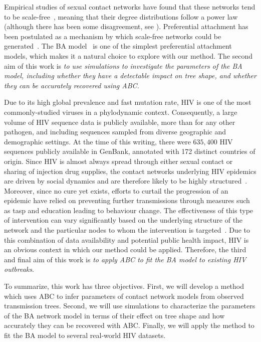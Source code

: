 Empirical studies of sexual contact networks have found that these networks
tend to be scale-free~\autocite{colgate1989risk, liljeros2001web,
schneeberger2004scale,clemenccon2015statistical}, meaning that their degree
distributions follow a power law (although there has been some disagreement,
see \autocite{handcock2004likelihood, bansal2007individual}). Preferential
attachment has been postulated as a mechanism by which scale-free networks
could be generated~\autocite{barabasi1999emergence}. The \gls{BA}
model~\autocite{barabasi1999emergence} is one of the simplest preferential
attachment models, which makes it a natural choice to explore with our method.
The second aim of this work is \emph{to use simulations to investigate the
parameters of the \gls{BA} model, including whether they have a detectable
impact on tree shape, and whether they can be accurately recovered using
\gls{ABC}.}

Due to its high global prevalence and fast mutation rate, \gls{HIV} is one of
the most commonly-studied viruses in a phylodynamic context. Consequently, a
large volume of \gls{HIV} sequence data is publicly available, more than for
any other pathogen, and including sequences sampled from diverse geographic and
demographic settings. At the time of this writing, there were $635,400$ HIV
sequences publicly available in GenBank, annotated with 172 distinct countries
of origin. Since \gls{HIV} is almost always spread through either sexual
contact or sharing of injection drug supplies, the contact networks underlying
\gls{HIV} epidemics are driven by social dynamics and are therefore likely to
be highly structured~\autocite{clemenccon2015statistical}. Moreover, since no
cure yet exists, efforts to curtail the progression of an epidemic have relied
on preventing further transmissions through measures such as \gls{tasp} and
education leading to behaviour change. The effectiveness of this type of
intervention can vary significantly based on the underlying structure of the
network and the particular nodes to whom the intervention is
targeted~\autocite{little2014using,wang2015targeting}. Due to this combination
of data availability and potential public health impact, \gls{HIV} is an
obvious context in which our method could be applied. Therefore, the third and
final aim of this work is \emph{to apply \gls{ABC} to fit the \gls{BA} model to
existing \gls{HIV} outbreaks}.

To summarize, this work has three objectives. First, we will develop a method
which uses \gls{ABC} to infer parameters of contact network models from
observed transmission trees. Second, we will use simulations to characterize
the parameters of the \gls{BA} network model in terms of their effect on tree
shape and how accurately they can be recovered with \gls{ABC}. Finally, we will
apply the method to fit the \gls{BA} model to several real-world \gls{HIV}
datasets.

